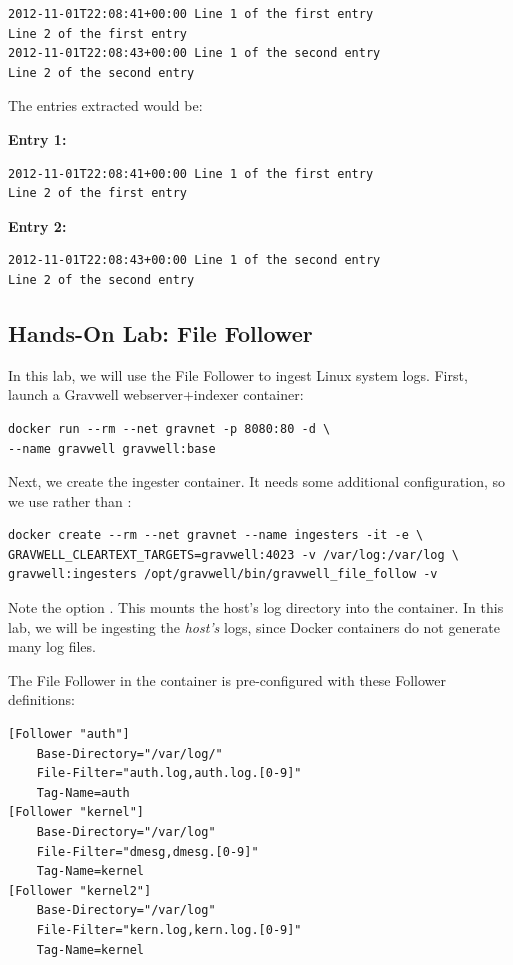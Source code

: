 \begin{Verbatim}[breaklines=true]
2012-11-01T22:08:41+00:00 Line 1 of the first entry
Line 2 of the first entry
2012-11-01T22:08:43+00:00 Line 1 of the second entry
Line 2 of the second entry
\end{Verbatim}

The entries extracted would be:

\textbf{Entry 1:}

\begin{Verbatim}[breaklines=true]
2012-11-01T22:08:41+00:00 Line 1 of the first entry
Line 2 of the first entry
\end{Verbatim}

\textbf{Entry 2:}

\begin{Verbatim}[breaklines=true]
2012-11-01T22:08:43+00:00 Line 1 of the second entry
Line 2 of the second entry
\end{Verbatim}

\subsection{Hands-On Lab: File Follower}

In this lab, we will use the File Follower to ingest Linux system logs.
First, launch a Gravwell webserver+indexer container:

\begin{Verbatim}[breaklines=true]
docker run --rm --net gravnet -p 8080:80 -d \
--name gravwell gravwell:base
\end{Verbatim}

Next, we create the ingester container. It needs some additional
configuration, so we use \code{docker create} rather than :

\begin{Verbatim}[breaklines=true]
docker create --rm --net gravnet --name ingesters -it -e \
GRAVWELL_CLEARTEXT_TARGETS=gravwell:4023 -v /var/log:/var/log \
gravwell:ingesters /opt/gravwell/bin/gravwell_file_follow -v
\end{Verbatim}

Note the option \code{-v /var/log:/var/log}. This mounts the host's
log directory into the container. In this lab, we will be ingesting the
\emph{host's} logs, since Docker containers do not generate many log
files.

The File Follower in the container is pre-configured with these
Follower definitions:

\begin{Verbatim}[breaklines=true]
[Follower "auth"]
    Base-Directory="/var/log/"
    File-Filter="auth.log,auth.log.[0-9]"
    Tag-Name=auth
[Follower "kernel"]
    Base-Directory="/var/log"
    File-Filter="dmesg,dmesg.[0-9]"
    Tag-Name=kernel
[Follower "kernel2"]
    Base-Directory="/var/log"
    File-Filter="kern.log,kern.log.[0-9]"
    Tag-Name=kernel
\end{Verbatim}

